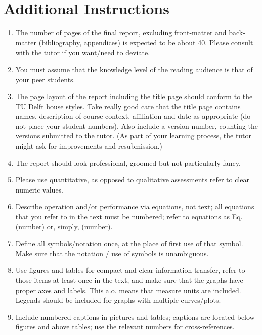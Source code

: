\chapter{ Additional Instructions}

\begin{enumerate}
\item  The number of pages of the final report, excluding front-matter and back-matter (bibliography, appendices) is expected to be about 40. Please consult with the tutor if you want/need to deviate.

\item  You must assume that the knowledge level of the reading audience is that of your peer students.

\item  The page layout of the report including the title page should conform to the TU Delft house styles. Take really good care that the title page contains names, description of course context, affiliation and date as appropriate (do not place your student numbers). Also include a version number, counting the versions submitted to the tutor. (As part of your learning process, the tutor might ask for improvements and resubmission.)

\item  The report should look professional, groomed but not particularly fancy.

\item  Please use quantitative, as opposed to qualitative assessments refer to clear numeric values.

\item  Describe operation and/or performance via equations, not text; all equations that you refer to in the text must be numbered; refer to equations as Eq. (number) or, simply, (number).

\item  Define all symbols/notation once, at the place of first use of that symbol. Make sure that the notation / use of symbols is unambiguous.

\item  Use figures and tables for compact and clear information transfer, refer to those items at least once in the text, and make sure that the graphs have proper axes and labels. This a.o. means that measure units are included. Legends should be included for graphs with multiple curves/plots.

\item  Include numbered captions in pictures and tables; captions are located below figures and above tables; use the relevant numbers for cross-references.
\end{enumerate}